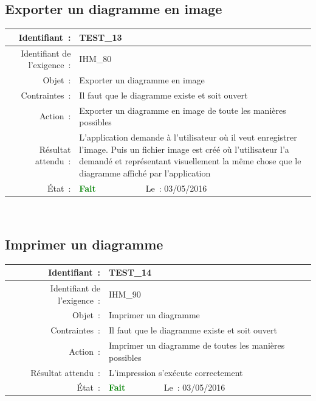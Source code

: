 \documentclass[hidelinks, a4paper,11pt,twoside,final]{article}
\begin{document}
    \subsection*{Exporter un diagramme en image}
    \begin{tabular}{|r|p{5cm}|p{5cm}|}\hline
    {Identifiant~:} & \multicolumn{2}{|p{10cm}|}{TEST\_13} \\\hline
    {Identifiant de l’exigence~:} & \multicolumn{2}{|p{10cm}|}{IHM\_80} \\\hline
        {Objet~:} & \multicolumn{2}{|p{10cm}|}{Exporter un diagramme en image} \\\hline
        {Contraintes~:} & \multicolumn{2}{|p{10cm}|}{Il faut que le diagramme existe et soit ouvert} \\\hline
        {Action~:} & \multicolumn{2}{|p{10cm}|}{Exporter un diagramme en image de toute les manières possibles} \\\hline
        {Résultat attendu~:} & \multicolumn{2}{|p{10cm}|}{L’application demande à l’utilisateur où il veut enregistrer l’image.
                              Puis un fichier image est créé où l’utilisateur l’a demandé et représentant
                              visuellement la même chose que le diagramme affiché par l’application} \\\hline
        {État~:} & {\textcolor{green}{\textbf{Fait}}} & {Le~: 03/05/2016 } \\\hline
    \end{tabular}
    \\
    \newline

    \subsection*{Imprimer un diagramme}
    \begin{tabular}{|r|p{5cm}|p{5cm}|}\hline
    {Identifiant~:} & \multicolumn{2}{|p{10cm}|}{TEST\_14} \\\hline
    {Identifiant de l’exigence~:} & \multicolumn{2}{|p{10cm}|}{IHM\_90} \\\hline
        {Objet~:} & \multicolumn{2}{|p{10cm}|}{Imprimer un diagramme} \\\hline
        {Contraintes~:} & \multicolumn{2}{|p{10cm}|}{Il faut que le diagramme existe et soit ouvert} \\\hline
        {Action~:} & \multicolumn{2}{|p{10cm}|}{Imprimer un diagramme de toutes les manières possibles} \\\hline
        {Résultat attendu~:} & \multicolumn{2}{|p{10cm}|}{L’impression s’exécute correctement} \\\hline
        {État~:} & {\textcolor{green}{\textbf{Fait}}} & {Le~: 03/05/2016 } \\\hline
    \end{tabular}
    \\
    \newline
\end{document}
